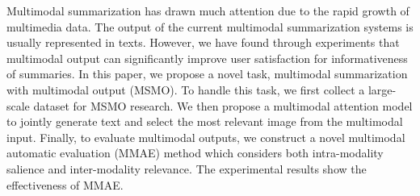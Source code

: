 Multimodal summarization has drawn much attention due to the rapid growth of multimedia data. The output of the current multimodal summarization systems is usually represented in texts. However, we have found through experiments that multimodal output can significantly improve user satisfaction for informativeness of summaries. In this paper, we propose a novel task, multimodal summarization with multimodal output (MSMO). To handle this task, we first collect a large-scale dataset for MSMO research. We then propose a multimodal attention model to jointly generate text and select the most relevant image from the multimodal input. Finally, to evaluate multimodal outputs, we construct a novel multimodal automatic evaluation (MMAE) method which considers both intra-modality salience and inter-modality relevance. The experimental results show the effectiveness of MMAE.
